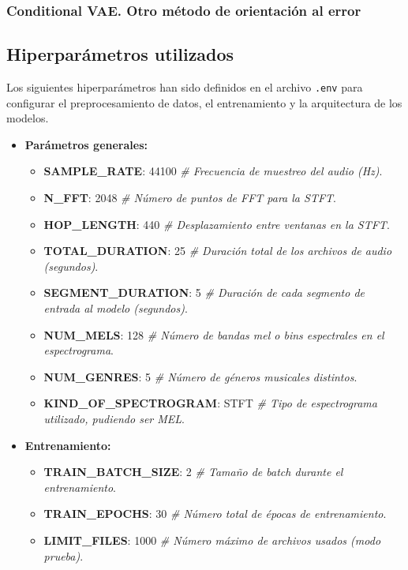 \subsubsection{Conditional VAE. Otro método de orientación al error}

\subsection*{Hiperparámetros utilizados}

Los siguientes hiperparámetros han sido definidos en el archivo \texttt{.env} para configurar el preprocesamiento de datos, el entrenamiento y la arquitectura de los modelos.

\begin{itemize}
  \item \textbf{Parámetros generales:}
  \begin{itemize}
    \item \textbf{SAMPLE\_RATE}: 44100 \emph{\# Frecuencia de muestreo del audio (Hz)}.
    \item \textbf{N\_FFT}: 2048 \emph{\# Número de puntos de FFT para la STFT}.
    \item \textbf{HOP\_LENGTH}: 440 \emph{\# Desplazamiento entre ventanas en la STFT}.
    \item \textbf{TOTAL\_DURATION}: 25 \emph{\# Duración total de los archivos de audio (segundos)}.
    \item \textbf{SEGMENT\_DURATION}: 5 \emph{\# Duración de cada segmento de entrada al modelo (segundos)}.
    \item \textbf{NUM\_MELS}: 128 \emph{\# Número de bandas mel o bins espectrales en el espectrograma}.
    \item \textbf{NUM\_GENRES}: 5 \emph{\# Número de géneros musicales distintos}.
    \item \textbf{KIND\_OF\_SPECTROGRAM}: STFT \emph{\# Tipo de espectrograma utilizado, pudiendo ser MEL}.
  \end{itemize}

  \item \textbf{Entrenamiento:}
  \begin{itemize}
    \item \textbf{TRAIN\_BATCH\_SIZE}: 2 \emph{\# Tamaño de batch durante el entrenamiento}.
    \item \textbf{TRAIN\_EPOCHS}: 30 \emph{\# Número total de épocas de entrenamiento}.
    \item \textbf{LIMIT\_FILES}: 1000 \emph{\# Número máximo de archivos usados (modo prueba)}.
  \end{itemize}


\end{itemize}
